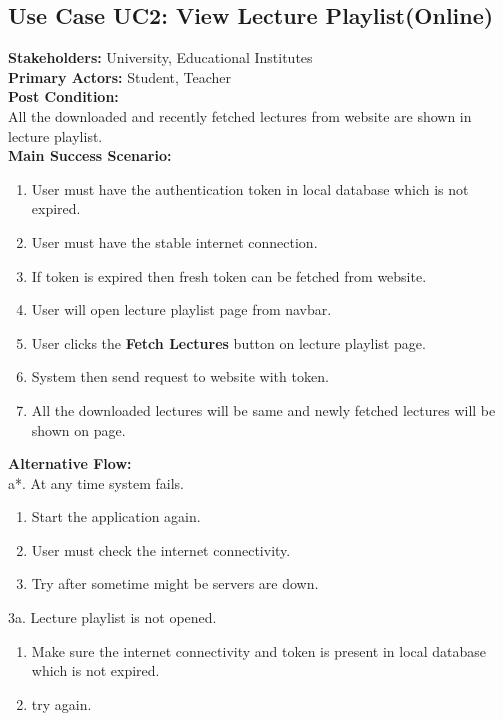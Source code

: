 \subsection{Use Case UC2: View Lecture Playlist(Online)}
\textbf{Stakeholders: } University, Educational Institutes \\
\textbf{Primary Actors: } Student, Teacher \\
\textbf{Post Condition: }\\
All the downloaded and recently fetched lectures from website are shown in lecture playlist.\\
\textbf{Main Success Scenario: }
\begin{enumerate}
\item User must have the authentication token in local database which is not expired.
\item User must have the stable internet connection.
\item If token is expired then fresh token can be fetched from website.
\item User will open lecture playlist page from navbar.
\item User clicks the \textbf{Fetch Lectures} button on lecture playlist page.
\item System then send request to website with token.
\item All the downloaded lectures will be same and newly fetched lectures will be shown on page. 
\end{enumerate}
\textbf{Alternative Flow: }\\
a*. At any time system fails.
\begin{enumerate}
\item Start the application again.
\item User must check the internet connectivity.
\item Try after sometime might be servers are down.
\end{enumerate}
3a. Lecture playlist is not opened.
\begin{enumerate}
\item Make sure the internet connectivity and token is present in local database which is not expired.
\item try again.
\end{enumerate}




